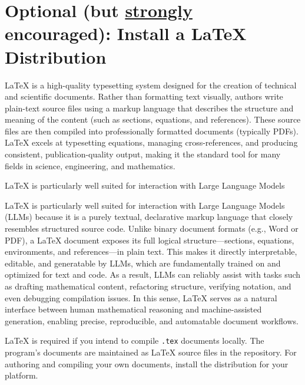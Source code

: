 \section{Optional (but \underline{strongly} encouraged): Install a \LaTeX{} Distribution}\label{sec:latex-install}

\LaTeX{} is a high-quality typesetting system designed for the creation of 
technical and scientific documents. Rather than formatting text visually, 
authors write plain-text source files using a markup language that describes 
the structure and meaning of the content (such as sections, equations, 
and references). These source files are then compiled into professionally 
formatted documents (typically PDFs). \LaTeX{} excels at typesetting 
equations, managing cross-references, and producing consistent, 
publication-quality output, making it the standard tool for many fields 
in science, engineering, and mathematics.

\begin{infobox}
	\LaTeX{} is particularly well suited for interaction with Large Language Models
\end{infobox}


\LaTeX{} is particularly well suited for interaction with Large Language Models 
(LLMs) because it is a purely textual, declarative markup language that closely 
resembles structured source code. Unlike binary document formats (e.g., Word or PDF), 
a \LaTeX{} document exposes its full logical structure---sections, equations, 
environments, and references---in plain text. This makes it directly 
interpretable, editable, and generatable by LLMs, which are fundamentally 
trained on and optimized for text and code. As a result, LLMs can reliably 
assist with tasks such as drafting mathematical content, refactoring structure, 
verifying notation, and even debugging compilation issues. In this sense, 
\LaTeX{} serves as a natural interface between human mathematical reasoning 
and machine-assisted generation, enabling precise, reproducible, and automatable 
document workflows.

\LaTeX{} is required if you intend to compile \texttt{.tex} documents
locally. The program's documents are maintained as \LaTeX{} source files
in the repository. For authoring and compiling your own
documents, install the distribution for your platform.


